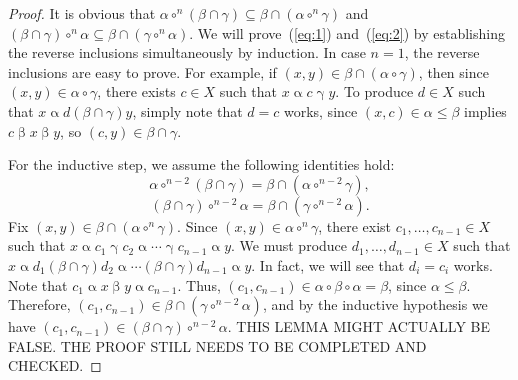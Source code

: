 \documentclass[11pt,reqno]{amsart}
\theoremstyle{plain}
\theoremstyle{definition}
\theoremstyle{remark}
\newcommand{\<}{\ensuremath{\langle}}
\renewcommand{\>}{\ensuremath{\rangle}}
\newcommand{\rel}[1]{\ensuremath{\mathbin{#1}}}
\renewcommand{\leq}{\ensuremath{\leqslant}}
\newcommand{\join}{\ensuremath{\vee}}
\begin{document}
\begin{proof}
It is obvious that 
$\alpha \circ^{n} (\beta \cap \gamma) \subseteq \beta \cap (\alpha \circ^n \gamma)$ 
and $ (\beta \cap \gamma) \circ^{n} \alpha \subseteq \beta \cap (\gamma \circ^n \alpha)$. 
We will prove~(\ref{eq:1}) and~(\ref{eq:2}) by establishing the reverse
inclusions simultaneously by induction.
In case $n=1$, the reverse inclusions are easy to prove.  For example,
if $(x,y) \in \beta \cap (\alpha\circ \gamma)$, then
since $(x,y) \in \alpha\circ \gamma$, there exists $c\in X$ such that $x\rel{\alpha} c
\rel{\gamma} y$.  To produce $d\in X$ such that 
$x \rel{\alpha} d \rel{(\beta\cap \gamma)} y$, simply note
that $d = c$ works, since %
$(x,c) \in \alpha \leq \beta$ implies $c \rel{\beta} x \rel{\beta} y$, so $(c,y) \in
\beta\cap \gamma$. 

For the inductive step, we assume the following identities hold:
\begin{equation}
   \label{eq:3}
   \alpha \circ^{n-2} (\beta \cap \gamma)= \beta \cap (\alpha \circ^{n-2} \gamma),
 \end{equation}
\begin{equation}
   \label{eq:4}
   (\beta \cap \gamma) \circ^{n-2} \alpha = \beta \cap (\gamma\circ^{n-2} \alpha).
 \end{equation}
Fix $(x,y) \in \beta \cap (\alpha\circ^n \gamma)$.
Since $(x,y) \in \alpha\circ^n \gamma$, there exist $c_1, \dots, c_{n-1}\in X$
such that 
$x\rel{\alpha} c_1 \rel{\gamma} c_2 \rel{\alpha} \cdots \rel{\gamma}c_{n-1}
\rel{\alpha} y$.  We must produce $d_1, \dots, d_{n-1}\in X$ such that 
$x \rel{\alpha} d_1 \rel{(\beta\cap \gamma)} d_2 \rel{\alpha} \cdots
\rel{(\beta\cap \gamma)} d_{n-1} 
\rel{\alpha} y$.
In fact, we will see that $d_i = c_i$ works.  Note that $c_1 \rel{\alpha} x
\rel{\beta} y \rel{\alpha} c_{n-1}$.  Thus, $(c_1, c_{n-1}) \in \alpha \circ
\beta \circ \alpha = \beta$, since $\alpha \leq \beta$.  Therefore,  
$(c_1, c_{n-1}) \in \beta \cap (\gamma \circ^{n-2} \alpha)$, and by the inductive
hypothesis we have
$(c_1, c_{n-1}) \in 
  (\beta \cap \gamma) \circ^{n-2} \alpha$.
\vskip2mm
THIS LEMMA MIGHT ACTUALLY BE FALSE.  THE PROOF STILL NEEDS TO BE COMPLETED AND CHECKED.  
\end{proof}
\end{document}
